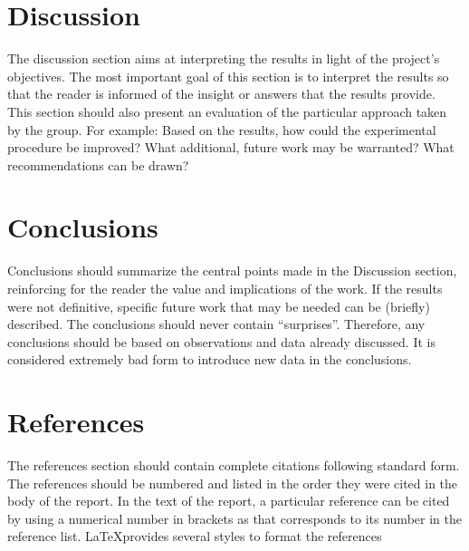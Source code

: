 \section{Discussion}
The discussion section aims at interpreting the results in light of the project's objectives. The most important goal of this section is to interpret the results so that the reader is informed of the insight or answers that the results provide. This section should also present an evaluation of the particular approach taken by the group. For example: Based on the results, how could the experimental procedure be improved? What additional, future work may be warranted? What recommendations can be drawn?


\section{Conclusions}
Conclusions should summarize the central points made in the Discussion section, reinforcing for the reader the value and implications of the work. If the results were not definitive, specific future work that may be needed can be (briefly) described. The conclusions should never contain ``surprises''. Therefore, any conclusions should be based on observations and data already discussed. It is considered extremely bad form to introduce new data in the conclusions.

\section*{References}

The references section should contain complete citations following standard form.  The references should be numbered and listed in the order they were cited in the body of the report. In the text of the report, a particular reference can be cited by using a numerical number in brackets as \cite{Lee2015} that corresponds to its number in the reference list. \LaTeX provides several styles to format the references





